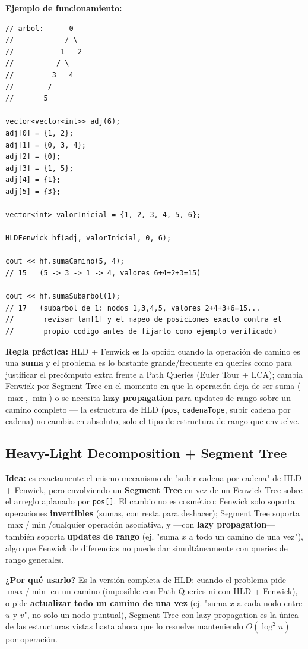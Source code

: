 \documentclass[10pt,a4paper,twocolumn]{article}
\begin{document}
\textbf{Ejemplo de funcionamiento:}

\begin{lstlisting}[style=cpp]
// arbol:      0
//            / \
//           1   2
//          / \
//         3   4
//        /
//       5

vector<vector<int>> adj(6);
adj[0] = {1, 2};
adj[1] = {0, 3, 4};
adj[2] = {0};
adj[3] = {1, 5};
adj[4] = {1};
adj[5] = {3};

vector<int> valorInicial = {1, 2, 3, 4, 5, 6};

HLDFenwick hf(adj, valorInicial, 0, 6);

cout << hf.sumaCamino(5, 4);
// 15   (5 -> 3 -> 1 -> 4, valores 6+4+2+3=15)

cout << hf.sumaSubarbol(1);
// 17   (subarbol de 1: nodos 1,3,4,5, valores 2+4+3+6=15...
//       revisar tam[1] y el mapeo de posiciones exacto contra el
//       propio codigo antes de fijarlo como ejemplo verificado)
\end{lstlisting}

\textbf{Regla práctica:} HLD + Fenwick es la opción cuando la
operación de camino es una \textbf{suma} y el problema es lo bastante
grande/frecuente en queries como para justificar el precómputo
extra frente a Path Queries (Euler Tour + LCA); cambia Fenwick por
Segment Tree en el momento en que la operación deja de ser suma
($\max$, $\min$) o se necesita \textbf{lazy propagation} para updates
de rango sobre un camino completo — la estructura de HLD
(\texttt{pos}, \texttt{cadenaTope}, subir cadena por cadena) no
cambia en absoluto, solo el tipo de estructura de rango que envuelve.


\subsection{Heavy-Light Decomposition + Segment Tree}

\textbf{Idea:} es exactamente el mismo mecanismo de "subir cadena por
cadena" de HLD + Fenwick, pero envolviendo un \textbf{Segment Tree}
en vez de un Fenwick Tree sobre el arreglo aplanado por
\texttt{pos[]}. El cambio no es cosmético: Fenwick solo soporta
operaciones \textbf{invertibles} (sumas, con resta para deshacer);
Segment Tree soporta $\max$/$\min$/cualquier operación asociativa, y
—con \textbf{lazy propagation}— también soporta \textbf{updates de
rango} (ej. "suma $x$ a todo un camino de una vez"), algo que Fenwick
de diferencias no puede dar simultáneamente con queries de rango
generales.

\textbf{¿Por qué usarlo?} Es la versión completa de HLD: cuando el
problema pide $\max$/$\min$ en un camino (imposible con Path Queries
ni con HLD + Fenwick), o pide \textbf{actualizar todo un camino de
una vez} (ej. "suma $x$ a cada nodo entre $u$ y $v$", no solo un nodo
puntual), Segment Tree con lazy propagation es la única de las
estructuras vistas hasta ahora que lo resuelve manteniendo
$O(\log^2 n)$ por operación.
\end{document}
